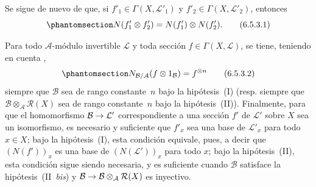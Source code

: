 \documentclass[oneside,10pt]{amsart}
\makeatletter
\newcommand{\ega@arrow}[2]{\mathchoice{#1}{#2}{#2}{#2}}
\renewcommand{\to}{\ega@arrow{\longrightarrow}{\rightarrow}}
\let\EGAOriginalLabel\label
\renewcommand{\label}[1]{\phantomsection\EGAOriginalLabel{#1}}
\makeatother
\begin{document}
\begin{env}[6.5.3]
Se sigue de nuevo de  que, si $f'_1\in\Gamma(X,\mathcal{L}'_1)$ y $f'_2\in\Gamma(X,\mathcal{L}'_2)$, entonces
\[
\label{II.6.5.3.1-fr}
N(f'_1\otimes f'_2)=N(f'_1)\otimes N(f'_2).
\tag{6.5.3.1}
\]

Para todo $\mathcal{A}$-módulo invertible $\mathcal{L}$ y toda sección $f\in\Gamma(X,\mathcal{L})$, se tiene, teniendo en cuenta ,
\[
\label{II.6.5.3.2-fr}
N_{\mathcal{B}/\mathcal{A}}(f\otimes1_{\mathcal{B}})=f^{\otimes n}
\tag{6.5.3.2}
\]
siempre que $\mathcal{B}$ sea de rango constante~$n$ bajo la hipótesis~(I) (resp. siempre que $\mathcal{B}\otimes_{\mathcal{A}}\mathcal{R}(X)$ sea de rango constante~$n$ bajo la hipótesis~(II)).
Finalmente, para que el homomorfismo $\mathcal{B}\to\mathcal{L}'$ correspondiente a una sección $f'$ de $\mathcal{L}'$ sobre $X$ sea un isomorfismo, es necesario y suficiente que $f'_x$ sea una base de $\mathcal{L}'_x$ para todo $x\in X$;
bajo la hipótesis~(I), esta condición equivale, pues, a decir que $(N(f'))_x$ es una base de $(N(\mathcal{L}'))_x$ para todo $x$;
bajo la hipótesis~(II), esta condición sigue siendo necesaria, y es suficiente cuando $\mathcal{B}$ satisface la hipótesis~(II~\emph{bis}) y $\mathcal{B}\to\mathcal{B}\otimes_{\mathcal{A}}\mathcal{R}(X)$ es inyectivo.
\end{env}
\end{document}
